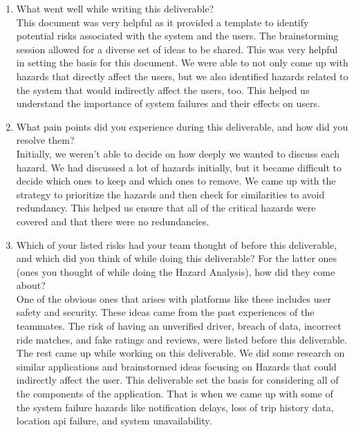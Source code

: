 \documentclass{article}
\begin{document}
\begin{enumerate}
    \item What went well while writing this deliverable? \\
    This document was very helpful as it provided a template to identify potential risks associated with the system and the users. The brainstorming session allowed for a diverse set of ideas to be shared. This was very helpful in setting the basis for this document. We were able to not only come up with hazards that directly affect the users, but we also identified hazards related to the system that would indirectly affect the users, too. This helped us understand the importance of system failures and their effects on users.
    
    \item What pain points did you experience during this deliverable, and how
    did you resolve them?\\
    Initially, we weren't able to decide on how deeply we wanted to discuss each hazard. We had discussed a lot of hazards initially, but it became difficult to decide which ones to keep and which ones to remove. We came up with the strategy to prioritize the hazards and then check for similarities to avoid redundancy. This helped us ensure that all of the critical hazards were covered and that there were no redundancies.
    
    \item Which of your listed risks had your team thought of before this
    deliverable, and which did you think of while doing this deliverable? For
    the latter ones (ones you thought of while doing the Hazard Analysis), how
    did they come about?\\
    One of the obvious ones that arises with platforms like these includes user safety and security. These ideas came from the past experiences of the teammates. The risk of having an unverified driver, breach of data, incorrect ride matches, and fake ratings and reviews, were listed before this deliverable. The rest came up while working on this deliverable. We did some research on similar applications and brainstormed ideas focusing on Hazards that could indirectly affect the user. This deliverable set the basis for considering all of the components of the application. That is when we came up with some of the system failure hazards like notification delays, loss of trip history data, location api failure, and system unavailability.   
    

\end{enumerate}
\end{document}
